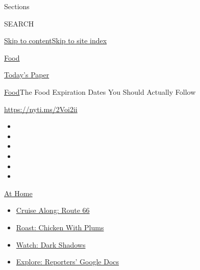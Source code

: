 Sections

SEARCH

\protect\hyperlink{site-content}{Skip to
content}\protect\hyperlink{site-index}{Skip to site index}

\href{https://www.nytimes3xbfgragh.onion/section/food}{Food}

\href{https://myaccount.nytimes3xbfgragh.onion/auth/login?response_type=cookie\&client_id=vi}{}

\href{https://www.nytimes3xbfgragh.onion/section/todayspaper}{Today's
Paper}

\href{/section/food}{Food}\textbar{}The Food Expiration Dates You Should
Actually Follow

\url{https://nyti.ms/2Voi2ii}

\begin{itemize}
\item
\item
\item
\item
\item
\item
\end{itemize}

\href{https://www.nytimes3xbfgragh.onion/spotlight/at-home?action=click\&pgtype=Article\&state=default\&region=TOP_BANNER\&context=at_home_menu}{At
Home}

\begin{itemize}
\tightlist
\item
  \href{https://www.nytimes3xbfgragh.onion/2020/09/07/travel/route-66.html?action=click\&pgtype=Article\&state=default\&region=TOP_BANNER\&context=at_home_menu}{Cruise
  Along: Route 66}
\item
  \href{https://www.nytimes3xbfgragh.onion/2020/09/04/dining/sheet-pan-chicken.html?action=click\&pgtype=Article\&state=default\&region=TOP_BANNER\&context=at_home_menu}{Roast:
  Chicken With Plums}
\item
  \href{https://www.nytimes3xbfgragh.onion/2020/09/04/arts/television/dark-shadows-stream.html?action=click\&pgtype=Article\&state=default\&region=TOP_BANNER\&context=at_home_menu}{Watch:
  Dark Shadows}
\item
  \href{https://www.nytimes3xbfgragh.onion/interactive/2020/at-home/even-more-reporters-editors-diaries-lists-recommendations.html?action=click\&pgtype=Article\&state=default\&region=TOP_BANNER\&context=at_home_menu}{Explore:
  Reporters' Google Docs}
\end{itemize}

